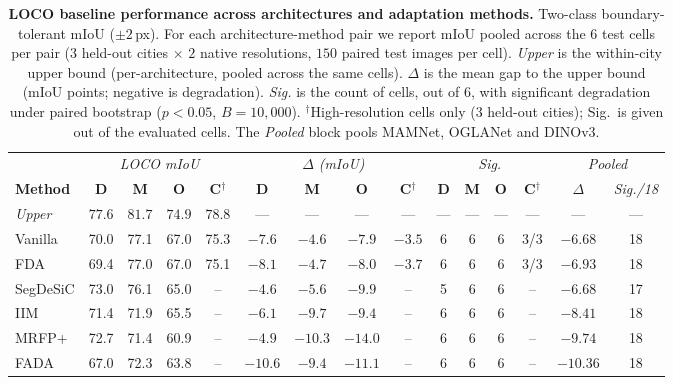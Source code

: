 \begin{table}[t]
\centering
\small
\setlength{\tabcolsep}{2.4pt}
\caption{
\textbf{LOCO baseline performance across architectures and adaptation methods.} Two-class boundary-tolerant mIoU ($\pm 2$\,px). For each architecture-method pair we report mIoU pooled across the $6$ test cells per pair ($3$ held-out cities $\times$ $2$ native resolutions, $150$ paired test images per cell). \textit{Upper} is the within-city upper bound (per-architecture, pooled across the same cells). $\Delta$ is the mean gap to the upper bound (mIoU points; negative is degradation). \textit{Sig.} is the count of cells, out of $6$, with significant degradation under paired bootstrap ($p < 0.05$, $B = 10{,}000$). $^\dagger$High-resolution cells only ($3$ held-out cities); Sig.\ is given out of the evaluated cells. The \textit{Pooled} block pools MAMNet, OGLANet and DINOv3.
}
\label{tab:loco-main}
\begin{tabular}{l|cccc|cccc|cccc|cc}
\toprule
& \multicolumn{4}{c|}{\textit{LOCO mIoU}}
& \multicolumn{4}{c|}{$\Delta$ \textit{(mIoU)}}
& \multicolumn{4}{c|}{\textit{Sig.}}
& \multicolumn{2}{c}{\textit{Pooled}} \\
\textbf{Method} & \textbf{D} & \textbf{M} & \textbf{O} & \textbf{C}$^\dagger$
                & \textbf{D} & \textbf{M} & \textbf{O} & \textbf{C}$^\dagger$
                & \textbf{D} & \textbf{M} & \textbf{O} & \textbf{C}$^\dagger$
                & $\Delta$ & \textit{Sig./18} \\
\midrule
\textit{Upper} & $\mathit{77.6}$ & $\mathit{81.7}$ & $\mathit{74.9}$ & $\mathit{78.8}$ & --- & --- & --- & --- & --- & --- & --- & --- & --- & --- \\
\midrule
Vanilla   & 70.0 & 77.1 & 67.0 & 75.3 & $-7.6$ & $-4.6$ & $-7.9$ & $-3.5$ & 6 & 6 & 6 & 3/3 & $-6.68$ & 18 \\
FDA       & 69.4 & 77.0 & 67.0 & 75.1 & $-8.1$ & $-4.7$ & $-8.0$ & $-3.7$ & 6 & 6 & 6 & 3/3 & $-6.93$ & 18 \\
SegDeSiC  & 73.0 & 76.1 & 65.0 & -- & $-4.6$ & $-5.6$ & $-9.9$ & -- & 5 & 6 & 6 & -- & $-6.68$ & 17 \\
IIM       & 71.4 & 71.9 & 65.5 & -- & $-6.1$ & $-9.7$ & $-9.4$ & -- & 6 & 6 & 6 & -- & $-8.41$ & 18 \\
MRFP+     & 72.7 & 71.4 & 60.9 & -- & $-4.9$ & $-10.3$ & $-14.0$ & -- & 6 & 6 & 6 & -- & $-9.74$ & 18 \\
FADA      & 67.0 & 72.3 & 63.8 & -- & $-10.6$ & $-9.4$ & $-11.1$ & -- & 6 & 6 & 6 & -- & $-10.36$ & 18 \\

\end{tabular}
\end{table}
